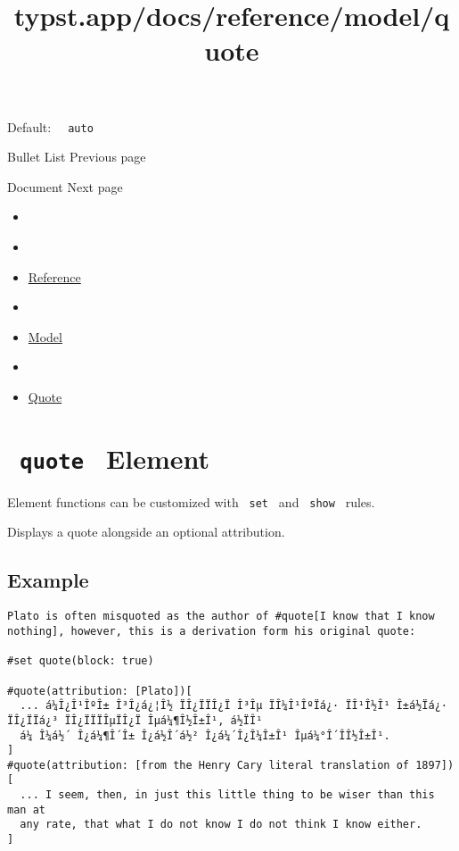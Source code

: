 Default: \texttt{\ }{\texttt{\ auto\ }}\texttt{\ }

\href{/docs/reference/model/list/}{\pandocbounded{}}

{ Bullet List } { Previous page }

\href{/docs/reference/model/document/}{\pandocbounded{}}

{ Document } { Next page }


\title{typst.app/docs/reference/model/quote}

\begin{itemize}
\tightlist
\item
  \href{/docs}{}
\item
  
\item
  \href{/docs/reference/}{Reference}
\item
  
\item
  \href{/docs/reference/model/}{Model}
\item
  
\item
  \href{/docs/reference/model/quote/}{Quote}
\end{itemize}

\section{\texorpdfstring{\texttt{\ quote\ } {{ Element
}}}{ quote   Element }}\label{summary}

\label{element-tooltip}
Element functions can be customized with \texttt{\ set\ } and
\texttt{\ show\ } rules.

Displays a quote alongside an optional attribution.

\subsection{Example}\label{example}

\begin{verbatim}
Plato is often misquoted as the author of #quote[I know that I know
nothing], however, this is a derivation form his original quote:

#set quote(block: true)

#quote(attribution: [Plato])[
  ... á¼Î¿Î¹ÎºÎ± Î³Î¿á¿¦Î½ ÏÎ¿ÏÏÎ¿Ï Î³Îµ ÏÎ¼Î¹ÎºÏá¿· ÏÎ¹Î½Î¹ Î±á½Ïá¿· ÏÎ¿ÏÏá¿³ ÏÎ¿ÏÏÏÎµÏÎ¿Ï Îµá¼¶Î½Î±Î¹, á½ÏÎ¹
  á¼ Î¼á½´ Î¿á¼¶Î´Î± Î¿á½Î´á½² Î¿á¼´Î¿Î¼Î±Î¹ Îµá¼°Î´Î­Î½Î±Î¹.
]
#quote(attribution: [from the Henry Cary literal translation of 1897])[
  ... I seem, then, in just this little thing to be wiser than this man at
  any rate, that what I do not know I do not think I know either.
]
\end{verbatim}

